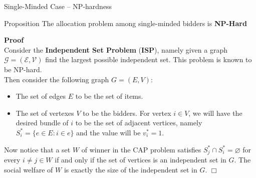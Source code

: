 \documentclass[aspectratio=169,xcolor=dvipsnames]{beamer}
\begin{document}
    
    \begin{frame}{Single-Minded Case – NP-hardness}
    \begin{block}{Proposition}
    The allocation problem among single-minded bidders is \textbf{NP-Hard}
    \end{block}
\pause
    \textbf{Proof}\\
    Consider the \textbf{Independent Set Problem} (\textbf{ISP}), namely given a graph $\mathcal{G} = (\mathcal{E},\mathcal{V})$ find the largest possible independent set. This problem is known to be NP-hard.\\
\pause
    Then consider the following graph $G = (E,V)$:
    \begin{itemize}
        \item The set of edges $E$ to be the set of items.
        \item The set of vertexes $V$ to be the bidders. For vertex $i \in V$, we will have the desired bundle of $i$ to be the set of adjacent vertices, namely $S^*_i = \{e \in E : i \in e\}$ and the value will be $v^*_i = 1$.
    \end{itemize}
\pause
    Now notice that a set $W$ of winner in the CAP problem satisfies $S^*_j \cap S^*_i = \varnothing$ for every $i \neq j \in W$ if and only if the set of vertices is an independent set in $G$. The social welfare of $W$ is exactly the size of the independent set in $G$. \hspace{1pt} $\Box$ 
    
    
    \end{frame}
\end{document}
